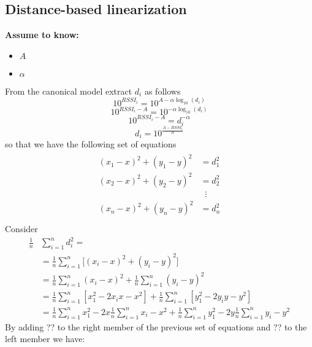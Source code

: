 \documentclass[12pt]{report}
\begin{document}
\subsection{Distance-based linearization}
  \begin{center}
  \textbf{Assume to know:}
  \begin{itemize}
    \centering
    \item $A$
    \item $\alpha$
  \end{itemize}
  \end{center}
From the canonical model extract $d_i$ as follows
\begin{equation*}
    10^{RSSI_{i}}=10^{A-\alpha\log_{10}(d_i)}
\end{equation*}
\begin{equation*}
    10^{RSSI_{i}-A}=10^{-\alpha\log_{10}(d_i)}
\end{equation*}
\begin{equation*}
     10^{RSSI_{i}-A}=d_i^{-\alpha}
\end{equation*}
\begin{equation}
    d_i=10^{\frac{A-RSSI_{i}}{\alpha}}
\end{equation}
so that we have the following set of equations
\begin{align}
\begin{split} 
(x_1-x)^2+(y_1-y)^2&=d_1^2 \\ 
(x_2-x)^2+(y_2-y)^2&=d_2^2 \\ 
&\;\;\vdots\\
(x_n-x)^2+(y_n-y)^2&=d_n^2 \\
\end{split}
\end{align}
Consider 
\begin{align}
\frac{1}{n}&\sum_{i=1}^nd_i^2=\\
&=\frac{1}{n}\sum_{i=1}^n\big[(x_i-x)^2+(y_i-y)^2\big]\\
&=\frac{1}{n}\sum_{i=1}^n(x_i-x)^2+\frac{1}{n}\sum_{i=1}^n(y_i-y)^2\\
&=\frac{1}{n}\sum_{i=1}^n[x_1^2-2x_ix-x^2] + \frac{1}{n}\sum_{i=1}^n[y_1^2-2y_iy-y^2]\\
&=\frac{1}{n}\sum_{i=1}^nx_1^2-2x\frac{1}{n}\sum_{i=1}^nx_i- x^2 + \frac{1}{n}\sum_{i=1}^ny_1^2-2y\frac{1}{n}\sum_{i=1}^ny_i- y^2
\end{align}
By adding ?? to the right member of the previous set of equations and ?? to the left member we have:
\end{document}
